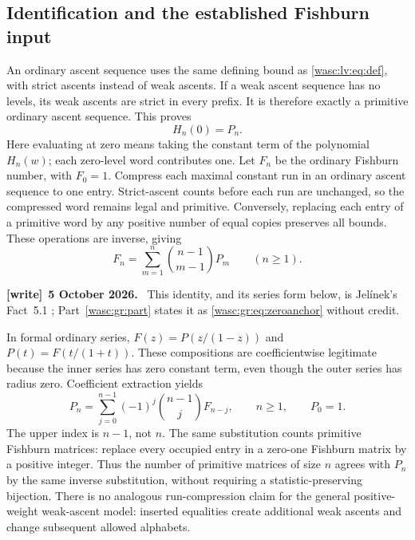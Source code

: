 \documentclass[11pt,a4paper]{article}
\theoremstyle{remark}\newtheorem{remark}[theorem]{Remark}
\numberwithin{equation}{section}
\newenvironment{writenote}[1][]{\par\smallskip\begingroup\small
 \noindent\textbf{[write]}\if\relax\detokenize{#1}\relax\else~\textbf{#1.}\fi\ }%
 {\par\endgroup\smallskip}
\begin{document}
\subsection{Identification and the established Fishburn input}
An ordinary ascent sequence uses the same defining bound as \eqref{wasc:lv:eq:def}, with strict ascents instead of weak ascents. If a weak ascent sequence has no levels, its weak ascents are strict in every prefix. It is therefore exactly a primitive ordinary ascent sequence. This proves
\begin{equation}\label{wasc:lv:eq:zerocombo}
H_n(0)=P_n.
\end{equation}
Here evaluating at zero means taking the constant term of the polynomial $H_n(w)$; each zero-level word contributes one.
Let $F_n$ be the ordinary Fishburn number, with $F_0=1$. Compress each maximal constant run in an ordinary ascent sequence to one entry. Strict-ascent counts before each run are unchanged, so the compressed word remains legal and primitive. Conversely, replacing each entry of a primitive word by any positive number of equal copies preserves all bounds. These operations are inverse, giving
\begin{equation}\label{wasc:lv:eq:forwardtransform}
F_n=\sum_{m=1}^n\binom{n-1}{m-1}P_m\qquad(n\ge1).
\end{equation}
\begin{writenote}[5 October 2026]
This identity, and its series form below, is Jel\'inek's Fact~5.1 \cite{jelinek}; Part~\ref{wasc:gr:part} states it as \eqref{wasc:gr:eq:zeroanchor} without credit.
\end{writenote}
In formal ordinary series, $F(z)=P(z/(1-z))$ and $P(t)=F(t/(1+t))$. These compositions are coefficientwise legitimate because the inner series has zero constant term, even though the outer series has radius zero. Coefficient extraction yields
\begin{equation}\label{wasc:lv:eq:inversebinomial}
P_n=\sum_{j=0}^{n-1}(-1)^j\binom{n-1}{j}F_{n-j},\qquad n\ge1,\qquad P_0=1.
\end{equation}
The upper index is $n-1$, not $n$.
The same substitution counts primitive Fishburn matrices: replace every occupied entry in a zero-one Fishburn matrix by a positive integer. Thus the number of primitive matrices of size $n$ agrees with $P_n$ by the same inverse substitution, without requiring a statistic-preserving bijection.
There is no analogous run-compression claim for the general positive-weight weak-ascent model: inserted equalities create additional weak ascents and change subsequent allowed alphabets.
\end{document}
